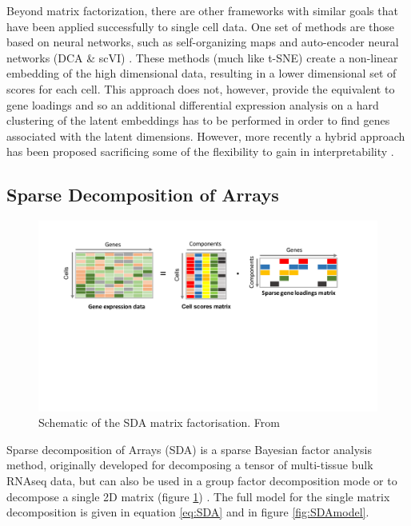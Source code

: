 Beyond matrix factorization, there are other frameworks with similar goals that have been applied successfully to single cell data. One set of methods are those based on neural networks, such as self-organizing maps \parencite{Loffler-Wirth2015oposSOM, Kim2015SingleCell} and auto-encoder neural networks (DCA \& scVI) \parencite{Eraslan2019Singlecell, Lopez2018Deep}. These methods (much like t-SNE) create a non-linear embedding of the high dimensional data, resulting in a lower dimensional set of scores for each cell. This approach does not, however, provide the equivalent to gene loadings and so an additional differential expression analysis on a hard clustering of the latent embeddings has to be performed in order to find genes associated with the latent dimensions. However, more recently a hybrid approach has been proposed sacrificing some of the flexibility to gain in interpretability \parencite{Svensson2019Interpretable}.


\subsection{Sparse Decomposition of Arrays}


\begin{figure}[H]
	\centering
	\includegraphics[width=\textwidth]{figures/intro/matrix_decomp_cells.pdf}
	\caption[SDA Matrix Factorisation]{Schematic of the SDA matrix factorisation. From \parencite{Hore2015Latent}}
	\label{fig:SDAfactorisation}
\end{figure}

Sparse decomposition of Arrays (SDA) is a sparse Bayesian factor analysis method, originally developed for decomposing a tensor of multi-tissue bulk RNAseq data, but can also be used in a group factor decomposition mode or to decompose a single 2D matrix (figure \ref{fig:SDAfactorisation}) \parencite{Hore2015Latent, Hore2016Tensor}. The full model for the single matrix decomposition is given in equation \ref{eq:SDA} and in figure \ref{fig:SDAmodel}.

